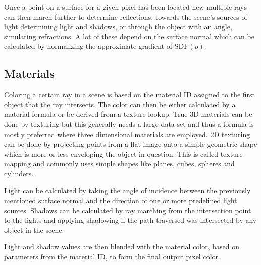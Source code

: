 				Once a point on a surface for a given pixel has been located
				new multiple rays can then march further to determine
				reflections, towards the scene's sources of light determining
				light and shadows, or through the object with an angle,
				simulating refractions. A lot of these depend on the surface
				normal which can be calculated by normalizing the approximate
				gradient of $\text{SDF}(p)$. 

			\subsection{Materials}
				Coloring a certain ray in a scene is based on the material ID
				assigned to the first object that the ray intersects. The color
				can then be either calculated by a material formula or be 
				derived from a texture lookup. True 3D materials can be done by
				texturing but this generally needs a large data set and thus a 
				formula is mostly preferred where three dimensional materials 
				are employed. 2D texturing can be done by projecting points from
				a flat image onto a simple geometric shape  which is more or less 
				enveloping the object in question. This is called texture-mapping 
				and commonly uses simple shapes like planes, cubes, spheres and 
				cylinders. 

				Light can be calculated by taking the angle of incidence between
				the previously mentioned surface normal and the direction of one 
				or more predefined light sources. Shadows can be calculated by 
				ray marching from the intersection point to the lights and 
				applying shadowing if the path traversed was intersected by any
				object in the scene. 

				Light and shadow values are then blended with the material color,
				based on parameters from the material ID, to form the final 
				output pixel color.
